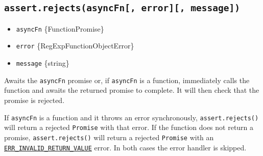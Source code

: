 \begin{Shaded}
\begin{Highlighting}[]
 \OperatorTok{;}

\NormalTok{(}\NormalTok{)}\OperatorTok{;}
\CommentTok{//}
\end{Highlighting}
\end{Shaded}

\begin{Shaded}
\begin{Highlighting}[]
\OperatorTok{=} \NormalTok{(}\NormalTok{)}\OperatorTok{;}

\NormalTok{(}\NormalTok{)}\OperatorTok{;}
\CommentTok{//}
\end{Highlighting}
\end{Shaded}

\subsection{\texorpdfstring{\texttt{assert.rejects(asyncFn{[},\ error{]}{[},\ message{]})}}{assert.rejects(asyncFn{[}, error{]}{[}, message{]})}}\label{assert.rejectsasyncfn-error-message}

\begin{itemize}
\tightlist
\item
  \texttt{asyncFn} \{Function\textbar Promise\}
\item
  \texttt{error}
  \{RegExp\textbar Function\textbar Object\textbar Error\}
\item
  \texttt{message} \{string\}
\end{itemize}

Awaits the \texttt{asyncFn} promise or, if \texttt{asyncFn} is a
function, immediately calls the function and awaits the returned promise
to complete. It will then check that the promise is rejected.

If \texttt{asyncFn} is a function and it throws an error synchronously,
\texttt{assert.rejects()} will return a rejected \texttt{Promise} with
that error. If the function does not return a promise,
\texttt{assert.rejects()} will return a rejected \texttt{Promise} with
an
\href{errors.md\#err_invalid_return_value}{\texttt{ERR\_INVALID\_RETURN\_VALUE}}
error. In both cases the error handler is skipped.


